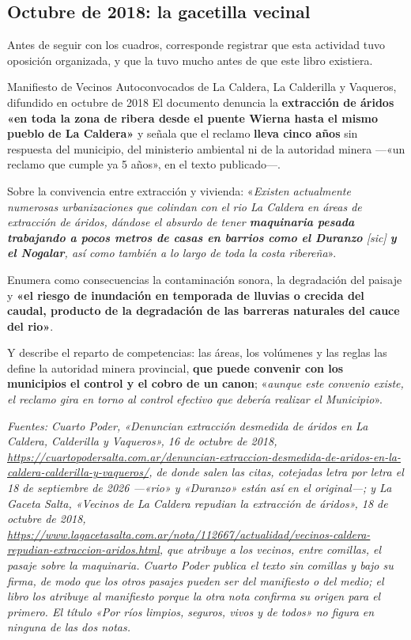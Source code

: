 \subsection*{Octubre de 2018: la gacetilla vecinal}

Antes de seguir con los cuadros, corresponde registrar que esta actividad tuvo oposición
organizada, y que la tuvo mucho antes de que este libro existiera.

\begin{ficha}{Manifiesto de Vecinos Autoconvocados de La Caldera, La Calderilla y Vaqueros, difundido en octubre de 2018}
El documento denuncia la \textbf{extracción de áridos «en toda la zona de ribera desde el puente
Wierna hasta el mismo pueblo de La Caldera»} y señala que el reclamo \textbf{lleva cinco años}
sin respuesta del municipio, del ministerio ambiental ni de la autoridad minera ---«un reclamo que cumple ya 5 años», en el texto publicado---.

Sobre la convivencia entre extracción y vivienda: «\textit{Existen actualmente numerosas
urbanizaciones que colindan con el rio La Caldera en áreas de extracción de áridos, dándose el
absurdo de tener \textbf{maquinaria pesada trabajando a pocos metros de casas en barrios
como el Duranzo} [sic] \textbf{y el Nogalar}, así como también a lo largo de toda la costa ribereña}».

Enumera como consecuencias la contaminación sonora, la degradación del paisaje y \textbf{«el
riesgo de inundación en temporada de lluvias o crecida del caudal, producto de la degradación de
las barreras naturales del cauce del rio»}.

Y describe el reparto de competencias: las áreas, los volúmenes y las reglas las define la
autoridad minera provincial, \textbf{que puede convenir con los municipios el control y el cobro
de un canon}; «\textit{aunque este convenio existe, el reclamo gira en torno al control efectivo
que debería realizar el Municipio}».

\textit{Fuentes: \textit{Cuarto Poder}, «Denuncian extracción desmedida de áridos en La Caldera, Calderilla y Vaqueros», 16 de octubre de 2018, \url{https://cuartopodersalta.com.ar/denuncian-extraccion-desmedida-de-aridos-en-la-caldera-calderilla-y-vaqueros/}, de donde salen las citas, cotejadas letra por letra el 18 de septiembre de 2026 ---«rio» y «Duranzo» están así en el original---; y \textit{La Gaceta Salta}, «Vecinos de La Caldera repudian la extracción de áridos», 18 de octubre de 2018, \url{https://www.lagacetasalta.com.ar/nota/112667/actualidad/vecinos-caldera-repudian-extraccion-aridos.html}, que atribuye a los vecinos, entre comillas, el pasaje sobre la maquinaria. Cuarto Poder publica el texto sin comillas y bajo su firma, de modo que los otros pasajes pueden ser del manifiesto o del medio; el libro los atribuye al manifiesto porque la otra nota confirma su origen para el primero. El título «Por ríos limpios, seguros, vivos y de todos» no figura en ninguna de las dos notas.} 
\end{ficha}

